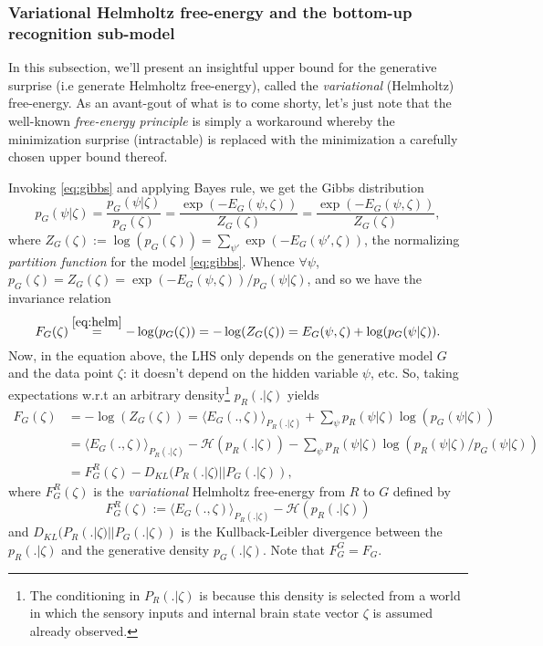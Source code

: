\documentclass{article} %
\begin{document}
\subsubsection{Variational Helmholtz free-energy and the bottom-up recognition sub-model}
In this subsection, we'll present an insightful upper bound for the generative surprise (i.e generate Helmholtz free-energy), called the \textit{variational} (Helmholtz) free-energy. As an avant-gout of what is to come shorty, let's just note that the well-known \textit{free-energy principle} is simply a workaround whereby the minimization surprise (intractable) is replaced with the  minimization a carefully chosen upper bound thereof.

Invoking \eqref{eq:gibbs} and applying Bayes rule, we get the Gibbs
distribution
\begin{equation}
  p_G(\psi|\zeta) = \frac{p_G(\psi|\zeta)}{p_G(\zeta)} = \frac{\exp(-E_G(\psi, \zeta))}{Z_G(\zeta)} = \frac{\exp(-E_G(\psi, \zeta))}{Z_G(\zeta)},
\end{equation}
where $Z_G(\zeta) := \log(p_G(\zeta)) = \sum_{\psi'}\exp(-E_G(\psi',\zeta))$, the normalizing \textit{partition function} for the model \ref{eq:gibbs}.
Whence $\forall \psi$, $p_G(\zeta) = Z_G(\zeta) = \exp(-E_G(\psi, \zeta)) / p_G(\psi|\zeta)$, and so we have the invariance relation
\begin{equation}
F_G(\zeta)\overset{\eqref{eq:helm}}{=} -\log(p_G(\zeta)) = -\log(Z_G(\zeta)) = E_G(\psi, \zeta) + \log(p_G(\psi|\zeta)).
  \end{equation}
Now, in the equation above, the LHS only depends on the generative model $G$ and the data point $\zeta$: it doesn't depend on the hidden variable $\psi$, etc. So, taking expectations w.r.t an arbitrary density\footnote{The conditioning in $P_R(.|\zeta)$ is because this density is selected from a world in which the sensory inputs and internal brain state vector $\zeta$ is assumed already observed.} $p_R(.|\zeta)$ yields
\begin{equation}
  \begin{split}
    F_G(\zeta) &= -\log(Z_G(\zeta)) = \langle E_G(., \zeta)\rangle_{P_R(.|\zeta)} + \sum_{\psi}p_R(\psi|\zeta)\log(p_G(\psi|\zeta))\\
    &= \langle E_G(., \zeta)\rangle_{P_R(.|\zeta)} - \mathcal H(p_R(.|\zeta)) - \sum_{\psi}p_R(\psi|\zeta)\log(p_R(\psi|\zeta)/p_G(\psi|\zeta))\\
    &= F^R_G(\zeta) - D_{KL}(P_R(.|\zeta) || P_G(.|\zeta)),
  \end{split}
  \label{eq:fe}
\end{equation}
where $F^R_G(\zeta)$ is the \textit{variational} Helmholtz free-energy from $R$ to $G$ defined by
\begin{equation}
  F^R_G(\zeta) := \langle E_G(., \zeta)\rangle_{P_R(.|\zeta)} - \mathcal H(p_R(.|\zeta))
\end{equation}
and $D_{KL}(P_R(.|\zeta) || P_G(.|\zeta))$ is the Kullback-Leibler divergence between the $p_R(.|\zeta)$ and the generative density $p_G(.|\zeta)$. Note that $F^G_G = F_G$.
\end{document}
